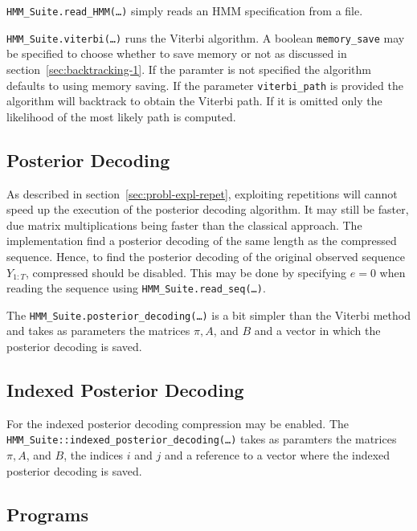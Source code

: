 \texttt{HMM\_Suite.read\_HMM(\dots)} simply reads an HMM specification from a
file.

\texttt{HMM\_Suite.viterbi(\dots)} runs the Viterbi algorithm. A boolean
\texttt{memory\_save} may be specified to choose whether to save memory or not
as discussed in section~\ref{sec:backtracking-1}. If the paramter is not
specified the algorithm defaults to using memory saving. If the parameter
\texttt{viterbi\_path} is provided the algorithm will backtrack to obtain the
Viterbi path. If it is omitted only the likelihood of the most likely path is
computed.

\subsection{Posterior Decoding}

As described in section~\ref{sec:probl-expl-repet}, exploiting repetitions will
cannot speed up the execution of the posterior decoding algorithm. It may still
be faster, due matrix multiplications being faster than the classical
approach. The implementation find a posterior decoding of the same length as
the compressed sequence. Hence, to find the posterior decoding of the original
observed sequence $Y_{1:T}$, compressed should be disabled. This may be done by
specifying $e = 0$ when reading the sequence using
\texttt{HMM\_Suite.read\_seq(\dots)}.

The \texttt{HMM\_Suite.posterior\_decoding(\dots)} is a bit simpler than the
Viterbi method and takes as parameters the matrices $\pi, A$, and $B$ and a
vector in which the posterior decoding is saved.

\subsection{Indexed Posterior Decoding}

For the indexed posterior decoding compression may be enabled. The
\texttt{HMM\_Suite::indexed\_posterior\_decoding(\dots)} takes as paramters the
matrices $\pi, A$, and $B$, the indices $i$ and $j$ and a reference to a vector
where the indexed posterior decoding is saved.

\subsection{Programs}


